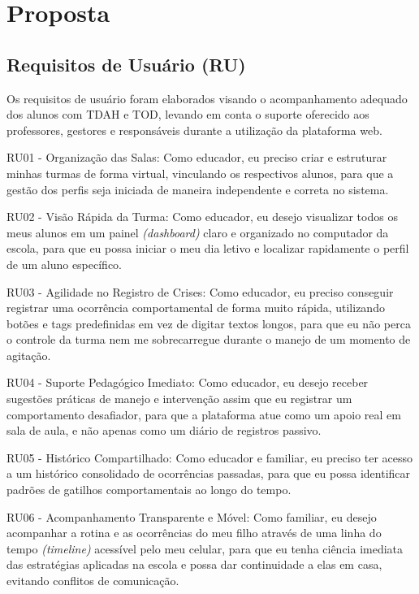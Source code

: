 \chapter{Proposta}
\label{chap:proposta}

\vspace{0.2cm}
\section{Requisitos de Usuário (RU)}

Os requisitos de usuário foram elaborados visando o acompanhamento adequado dos alunos com TDAH e TOD, levando em conta o suporte oferecido aos professores, gestores e responsáveis durante a utilização da plataforma web.

\vspace{0.3cm}
RU01 - Organização das Salas: Como educador, eu preciso criar e estruturar minhas turmas de forma virtual, vinculando os respectivos alunos, para que a gestão dos perfis seja iniciada de maneira independente e correta no sistema.

RU02 - Visão Rápida da Turma: Como educador, eu desejo visualizar todos os meus alunos em um painel \textit{(dashboard)} claro e organizado no computador da escola, para que eu possa iniciar o meu dia letivo e localizar rapidamente o perfil de um aluno específico.

RU03 - Agilidade no Registro de Crises: Como educador, eu preciso conseguir registrar uma ocorrência comportamental de forma muito rápida, utilizando botões e tags predefinidas em vez de digitar textos longos, para que eu não perca o controle da turma nem me sobrecarregue durante o manejo de um momento de agitação.

RU04 - Suporte Pedagógico Imediato: Como educador, eu desejo receber sugestões práticas de manejo e intervenção assim que eu registrar um comportamento desafiador, para que a plataforma atue como um apoio real em sala de aula, e não apenas como um diário de registros passivo.

RU05 - Histórico Compartilhado: Como educador e familiar, eu preciso ter acesso a um histórico consolidado de ocorrências passadas, para que eu possa identificar padrões de gatilhos comportamentais ao longo do tempo.

RU06 - Acompanhamento Transparente e Móvel: Como familiar, eu desejo acompanhar a rotina e as ocorrências do meu filho através de uma linha do tempo \textit{(timeline)} acessível pelo meu celular, para que eu tenha ciência imediata das estratégias aplicadas na escola e possa dar continuidade a elas em casa, evitando conflitos de comunicação.

